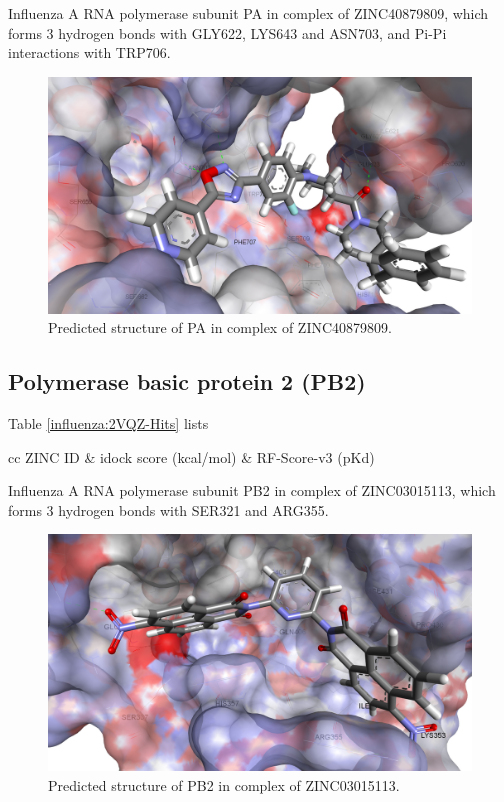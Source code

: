 Influenza A RNA polymerase subunit PA in complex of ZINC40879809, which forms 3 hydrogen bonds with GLY622, LYS643 and ASN703, and Pi-Pi interactions with TRP706.

\begin{figure}
\centering
\includegraphics[width=\linewidth]{../influenza/2ZNL-ZINC40879809.png}
\caption{Predicted structure of PA in complex of ZINC40879809.}
\label{influenza:2ZNL-ZINC40879809}
\end{figure}

\subsection{Polymerase basic protein 2 (PB2)}

Table \ref{influenza:2VQZ-Hits} lists

\begin{table}
\caption{Top ligands .}
\label{influenza:2VQZ-Hits}
\begin{tabular}{cc}
\hline
ZINC ID & idock score (kcal/mol) & RF-Score-v3 (pKd)\\
\hline
\hline
\end{tabular}
\end{table}

Influenza A RNA polymerase subunit PB2 in complex of ZINC03015113, which forms 3 hydrogen bonds with SER321 and ARG355.

\begin{figure}
\centering
\includegraphics[width=\linewidth]{../influenza/2VQZ-ZINC03015113.png}
\caption{Predicted structure of PB2 in complex of ZINC03015113.}
\label{influenza:2VQZ-ZINC03015113}
\end{figure}

